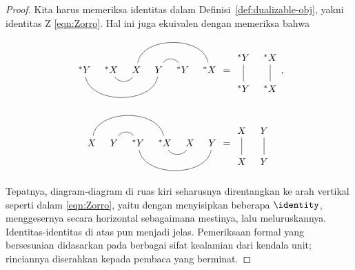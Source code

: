 \begin{proof}
	Kita harus memeriksa identitas dalam
	Definisi~\ref{def:dualizable-obj}, yakni identitas Z
	\eqref{eqn:Zorro}. Hal ini juga ekuivalen dengan memeriksa bahwa
	\begin{align*}
		\begin{tikzcd}[column sep=tiny, ampersand replacement=\&]
			{}^* Y \arrow[dash, rrr, bend right=80] \& {}^* X \arrow[dash, r, bend right=60] \& X \arrow[dash, rrr, bend left=80] \& Y \arrow[dash, r, bend left=60] \& {}^* Y \& {}^* X
		\end{tikzcd} & = \begin{tikzcd}[column sep=tiny, ampersand replacement=\&]
			{}^* Y \arrow[dash, d] \& {}^* X \arrow[dash, d] \\
			{}^* Y \& {}^* X 
		\end{tikzcd}, \\
		\begin{tikzcd}[column sep=tiny, ampersand replacement=\&]
			X \arrow[dash, rrr, bend left=80] \& Y \arrow[dash, r, bend left=60] \& {}^* Y \arrow[dash, rrr, bend right=80] \& {}^* X \arrow[dash, r, bend right=60] \& X \& Y
		\end{tikzcd} & = \begin{tikzcd}[column sep=tiny, ampersand replacement=\&]
			X \arrow[dash, d] \& Y \arrow[dash, d] \\
			X \& Y 
		\end{tikzcd}
	\end{align*}
	Tepatnya, diagram-diagram di ruas kiri seharusnya direntangkan ke arah
	vertikal seperti dalam \eqref{eqn:Zorro}, yaitu dengan menyisipkan beberapa
	$\identity$, menggesernya secara horizontal sebagaimana mestinya, lalu
	meluruskannya. Identitas-identitas di atas pun menjadi jelas. Pemeriksaan
	formal yang bersesuaian didasarkan pada berbagai sifat kealamian dari
	kendala unit; rinciannya diserahkan kepada pembaca yang berminat.
\end{proof}

